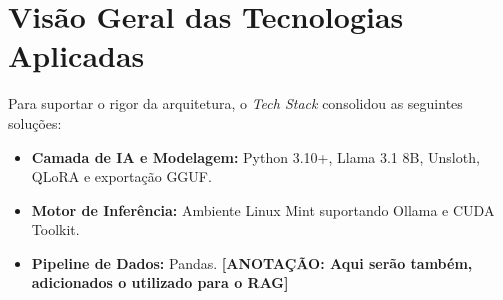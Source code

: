 \section{Visão Geral das Tecnologias Aplicadas}
Para suportar o rigor da arquitetura, o \textit{Tech Stack} consolidou as seguintes soluções:
\begin{itemize}
    \item \textbf{Camada de IA e Modelagem:} Python 3.10+, Llama 3.1 8B, Unsloth, QLoRA e exportação GGUF.
    \item \textbf{Motor de Inferência:} Ambiente Linux Mint suportando Ollama e CUDA Toolkit.
    \item \textbf{Pipeline de Dados:} Pandas. \textbf{[ANOTAÇÃO: Aqui serão também, adicionados o utilizado para o RAG]}
\end{itemize}
